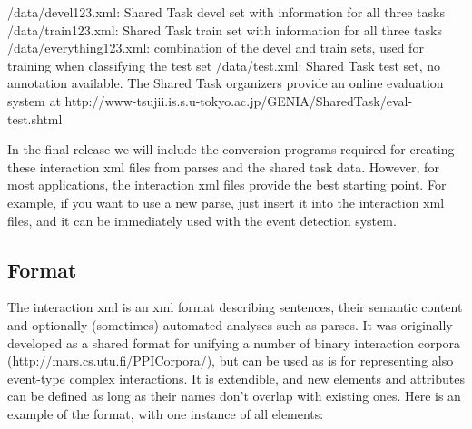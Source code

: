 \documentclass[a4paper,12pt]{article}
\begin{document}
/data/devel123.xml: Shared Task devel set with information for all three tasks
/data/train123.xml: Shared Task train set with information for all three tasks
/data/everything123.xml: combination of the devel and train sets, used for training when classifying the test set
/data/test.xml: Shared Task test set, no annotation available. The Shared Task organizers provide an online evaluation system at http://www-tsujii.is.s.u-tokyo.ac.jp/GENIA/SharedTask/eval-test.shtml

In the final release we will include the conversion programs required for creating these interaction xml files from parses and the shared task data. However, for most applications, the interaction xml files provide the best starting point. For example, if you want to use a new parse, just insert it into the interaction xml files, and it can be immediately used with the event detection system.

\subsection{Format}

The interaction xml is an xml format describing sentences, their semantic content and optionally (sometimes) automated analyses such as parses. It was originally developed as a shared format for unifying a number of binary interaction corpora (http://mars.cs.utu.fi/PPICorpora/), but can be used as is for representing also event-type complex interactions. It is extendible, and new elements and attributes can be defined as long as their names don't overlap with existing ones. Here is an example of the format, with one instance of all elements:

\lstset{%
language=XML,                %
showspaces=false,               %
showstringspaces=false,         %
numbers=left,                   %
basicstyle=\small, %
frame=single,	                %
breaklines=true                %
} %
\end{document}
